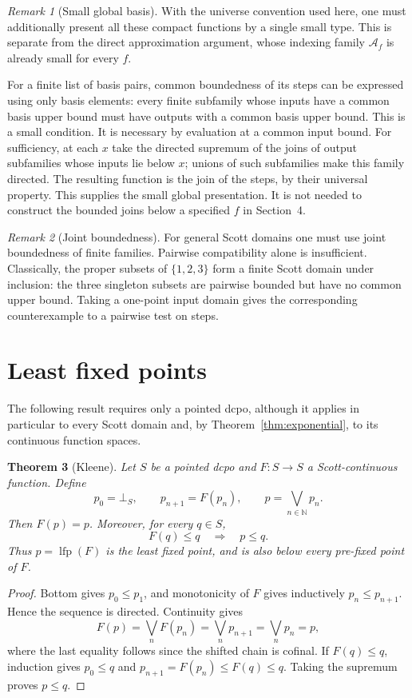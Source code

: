 \documentclass[11pt,a4paper]{article}
\newtheorem{theorem}{Theorem}[section]
\theoremstyle{definition}
\theoremstyle{remark}
\newtheorem{remark}[theorem]{Remark}
\newcommand{\lub}{\bigvee}
\newcommand{\N}{\mathbb N}
\DeclareMathOperator{\lfp}{lfp}
\begin{document}
\begin{remark}[Small global basis]
With the universe convention used here, one must additionally present
all these compact functions by a single small type. This is separate
from the direct approximation argument, whose indexing family
$\mathcal A_f$ is already small for every $f$.

For a finite list of basis pairs, common boundedness of its steps can be
expressed using only basis elements: every finite subfamily whose inputs
have a common basis upper bound must have outputs with a common basis
upper bound. This is a small condition. It is necessary by evaluation
at a common input bound. For sufficiency, at each $x$ take the directed
supremum of the joins of output subfamilies whose inputs lie below $x$;
unions of such subfamilies make this family directed. The resulting
function is the join of the steps, by their universal property.
This supplies the small global presentation. It is not needed to
construct the bounded joins below a specified $f$ in Section~4.
\end{remark}

\begin{remark}[Joint boundedness]
For general Scott domains one must use joint boundedness of finite
families. Pairwise compatibility alone is insufficient. Classically, the
proper subsets of $\{1,2,3\}$ form a finite Scott domain under inclusion:
the three singleton subsets are pairwise bounded but have no common
upper bound. Taking a one-point input domain gives the corresponding
counterexample to a pairwise test on steps.
\end{remark}

\section{Least fixed points}

The following result requires only a pointed dcpo, although it applies
in particular to every Scott domain and, by
Theorem~\ref{thm:exponential}, to its continuous function spaces.

\begin{theorem}[Kleene]\label{thm:kleene}
Let $S$ be a pointed dcpo and $F:S\to S$ a Scott-continuous function.
Define
\[
 p_0=\bot_S,\qquad p_{n+1}=F(p_n),\qquad
 p=\lub_{n\in\N}p_n.
\]
Then $F(p)=p$. Moreover, for every $q\in S$,
\[
 F(q)\leq q\quad\Longrightarrow\quad p\leq q.
\]
Thus $p=\lfp(F)$ is the least fixed point, and is also below every
pre-fixed point of $F$.
\end{theorem}
\begin{proof}
Bottom gives $p_0\leq p_1$, and monotonicity of $F$ gives inductively
$p_n\leq p_{n+1}$. Hence the sequence is directed. Continuity gives
\[
 F(p)=\lub_n F(p_n)=\lub_n p_{n+1}=\lub_n p_n=p,
\]
where the last equality follows since the shifted chain is cofinal.
If $F(q)\leq q$, induction gives $p_0\leq q$ and
$p_{n+1}=F(p_n)\leq F(q)\leq q$. Taking the supremum proves $p\leq q$.
\end{proof}
\end{document}

